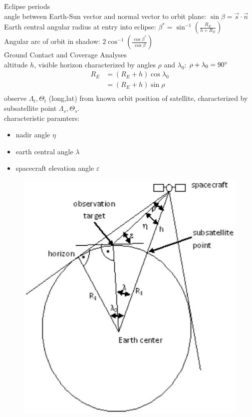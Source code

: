 \f{Eclipse periods}\\
angle between Earth-Sun vector and normal vector to orbit plane: $\sin \beta = \vec{s}\cdot\vec{n}$\\
Earth central angular radius at entry into eclipse: $\beta^* = \sin^{-1}\left(\frac{R_E}{h+R_E}\right)$\\
Angular arc of orbit in shadow: $2\cos^{-1}\left(\frac{\cos \beta^*}{\cos \beta}\right)$\\
\f{Ground Contact and Coverage Analyses}\\
altitude $h$, visible horizon characterized by angles $\rho$ and $\lambda_0$: $\rho + \lambda_0 = 90\degree$
\begin{align*}
 R_E &= (R_E + h) \cos \lambda_0\\
 &= (R_E +h) \sin \rho\\
\end{align*}
observe $\Lambda_t, \Theta_t$ (long,lat) from known orbit position of satellite, characterized by subsatellite point $\Lambda_s, \Theta_s$.\\
characteristic paramters:
\begin{itemize}
 \item nadir angle $\eta$
 \item earth central angle $\lambda$
 \item spacecraft elevation angle $\varepsilon$
\end{itemize}
\begin{figure}[!ht]
 \centering
 \includegraphics[scale=0.6]{groundcoverage}
\end{figure}
